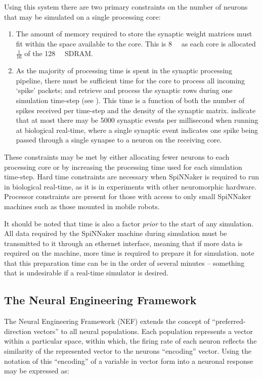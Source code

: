 \documentclass[conference]{IEEEtran}
\begin{document}
Using this system there are two primary constraints on the number of neurons that may be simulated on a single processing core:

  \begin{enumerate}
    \item The amount of memory required to store the synaptic weight matrices must fit within the space available to the core.
      This is \SI{8}{\mebi\byte} as each core is allocated $\frac{1}{16}$ of the \SI{128}{\mebi\byte} SDRAM.
    \item As the majority of processing time is spent in the synaptic processing pipeline, there must be sufficient time for the core to process all incoming `spike' packets; and retrieve and process the synaptic rows during one simulation time-step (see \parencite{Sharp2013}).
This time is a function of both the number of spikes received per time-step and the density of the synaptic matrix.
\textcite[\S III.C]{Sharp2013} indicate that at most there may be \num{5000} synaptic events per millisecond when running at biological real-time, where a single synaptic event indicates one spike being passed through a single synapse to a neuron on the receiving core.
  \end{enumerate}

These constraints may be met by either allocating fewer neurons to each processing core or by increasing the processing time used for each simulation time-step.
Hard time constraints are necessary when SpiNNaker is required to run in biological real-time, as it is in experiments with other neuromorphic hardware.
Processor constraints are present for those with access to only small SpiNNaker machines such as those mounted in mobile robots.

It should be noted that time is also a factor \textit{prior} to the start of any simulation.
All data required by the SpiNNaker machine during simulation must be transmitted to it through an ethernet interface, meaning that if more data is required on the machine, more time is required to prepare it for simulation.
\textcite{Sharp2013} note that this preparation time can be in the order of several minutes  -- something that is undesirable if a real-time simulator is desired.

  \subsection{The Neural Engineering Framework}
  \label{sec:background/nef}

The Neural Engineering Framework (NEF) extends the concept of ``preferred-direction vectors'' \parencite{Georgopoulos1986} to all neural populations.
Each population represents a vector within a particular space, within which, the firing rate of each neuron reflects the similarity of the represented vector to the neurons ``encoding'' vector.
Using the notation of \textcite{Stewart2014} this ``encoding'' of a variable in vector form into a neuronal response may be expressed as:
\end{document}
